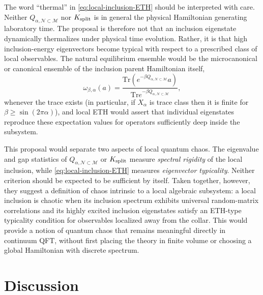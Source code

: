 \documentclass[a4paper,11pt]{article}
\theoremstyle{definition}
\newcommand{\Tr}{\text{Tr}}
\newcommand{\mN}{\mathcal{N}}
\newcommand{\mM}{\mathcal{M}}
\begin{document}
The word ``thermal'' in \eqref{eq:local-inclusion-ETH} should be interpreted with care.  Neither $Q_{\alpha,\mN\subset\mM}$ nor $K_{\rm split}$ is in general the physical Hamiltonian generating laboratory time.  The proposal is therefore not that an inclusion eigenstate dynamically thermalizes under physical time evolution.  Rather, it is that high inclusion-energy eigenvectors become typical with respect to a prescribed class of local observables.  The natural equilibrium ensemble would be the microcanonical or canonical ensemble of the inclusion parent Hamiltonian itself,
\begin{equation}
    \omega_{\beta,\alpha}(a)
    =
    \frac{
    \Tr\!\left(e^{-\beta Q_{\alpha,\mN\subset\mM}}a\right)
    }{
    \Tr e^{-\beta Q_{\alpha,\mN\subset\mM}}
    },
    \label{eq:local-inclusion-canonical}
\end{equation}
whenever the trace exists (in particular, if $X_\alpha$ is trace class then it is finite for $\beta\geq\sin(2\pi\alpha)$), and local ETH would assert that individual eigenstates reproduce these expectation values for operators sufficiently deep inside the subsystem.

This proposal would separate two aspects of local quantum chaos.  The eigenvalue and gap statistics of $Q_{\alpha,\mN\subset\mM}$ or $K_{\rm split}$ measure \emph{spectral rigidity} of the local inclusion, while \eqref{eq:local-inclusion-ETH} measures \emph{eigenvector typicality}.  Neither criterion should be expected to be sufficient by itself.  Taken together, however, they suggest a definition of chaos intrinsic to a local algebraic subsystem: a local inclusion is chaotic when its inclusion spectrum exhibits universal random-matrix correlations and its highly excited inclusion eigenstates satisfy an ETH-type typicality condition for observables localized away from the collar.  This would provide a notion of quantum chaos that remains meaningful directly in continuum QFT, without first placing the theory in finite volume or choosing a global Hamiltonian with discrete spectrum.

\section{Discussion}\label{sec:discussion}
\end{document}
